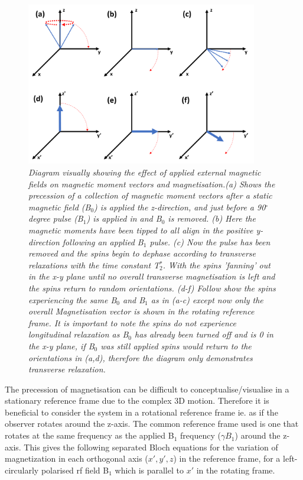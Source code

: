 \documentclass[class=article, crop=false]{standalone}
\begin{document}
\begin{figure}
    \centering
    \includegraphics[width=0.9\textwidth]{Figures/Theory/Magnetisation.png}
    \caption{\textit{Diagram visually showing the effect of applied external magnetic fields on magnetic moment vectors and magnetisation.(a) Shows the precession of a collection of magnetic moment vectors after a static magnetic field (B$_0$) is applied the z-direction, and just before a 90$^\circ$ degree pulse (B$_1$) is applied in and B$_0$ is removed. (b) Here the magnetic moments have been tipped to all align in the positive y-direction following an applied B$_1$ pulse. (c) Now the pulse has been removed and the spins begin to dephase according to transverse relaxations with the time constant T$_2^*$. With the spins 'fanning' out in the x-y plane until no overall transverse magnetisation is left and the spins return to random orientations. (d-f) Follow show the spins experiencing the same B$_0$ and B$_1$ as in (a-c) except now only the overall Magnetisation vector is shown in the rotating reference frame. It is important to note the spins do not experience longitudinal relaxation as B$_0$ has already been turned off and is 0 in the x-y plane, if B$_0$ was still applied spins would return to the orientations in (a,d), therefore the diagram only demonstrates transverse relaxation.}}
    \label{fig:theory:Mag}
\end{figure}

The precession of magnetisation can be difficult to conceptualise/visualise in a stationary reference frame due to the complex 3D motion. Therefore it is beneficial to consider the system in a rotational reference frame ie. as if the observer rotates around the z-axis. The common reference frame used is one that rotates at the same frequency as the applied B$_1$ frequency ($\gamma B_1$) around the z-axis. This gives the following separated Bloch equations for the variation of magnetization in each orthogonal axis ($x',y',z$) in the reference frame, for a left-circularly polarised rf field B$_1$ which is parallel to $x'$ in the rotating frame.
\end{document}
